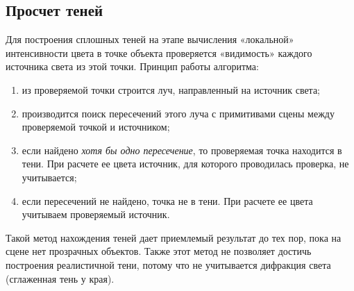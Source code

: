 \documentclass[a4paper, 10pt]{article}
\begin{document}
	\subsection{Просчет теней}
	\hspace*{5mm} Для построения сплошных теней на этапе вычисления «локальной» интенсивности цвета в точке объекта проверяется «видимость» каждого источника света из этой точки.
	\clearpage
	\newpage
	Принцип работы алгоритма:
	\begin{enumerate}
		\item из проверяемой точки строится луч, направленный на источник света;
		\item производится поиск пересечений этого луча с примитивами сцены между проверяемой точкой и источником;
		\item если найдено \textit{хотя бы одно пересечение}, то проверяемая точка находится в тени. При расчете ее цвета источник, для которого проводилась проверка, не учитывается;
		\item если пересечений не найдено, точка не в тени. При расчете ее цвета учитываем 
		проверяемый источник.
	\end{enumerate}
	\hspace*{5mm}Такой метод нахождения теней дает приемлемый результат до тех пор, пока на сцене нет прозрачных объектов. Также этот метод не позволяет достичь построения реалистичной тени, потому что не учитывается дифракция света (сглаженная тень у края).
\end{document}
